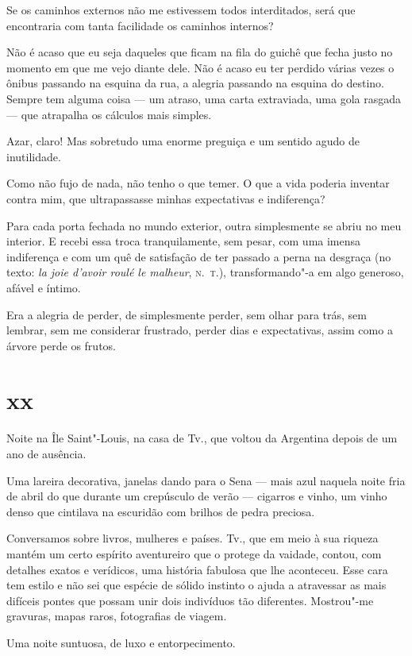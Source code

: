 Se os caminhos externos não me estivessem todos interditados, será que
encontraria com tanta facilidade os caminhos internos?

Não é acaso que eu seja daqueles que ficam na fila do guichê que fecha
justo no momento em que me vejo diante dele. Não é acaso eu ter perdido
várias vezes o ônibus passando na esquina da rua, a
alegria passando na esquina do destino. Sempre tem alguma coisa --- um
atraso, uma carta extraviada, uma gola rasgada --- que
atrapalha os cálculos mais simples.

Azar, claro! Mas sobretudo uma enorme preguiça e um sentido agudo de
inutilidade.

Como não fujo de nada, não tenho o que temer. O que a vida poderia
inventar contra mim, que ultrapassasse minhas expectativas e indiferença?

Para cada porta fechada no mundo exterior, outra simplesmente se abriu
no meu interior. E recebi essa troca tranquilamente, sem pesar, com uma
imensa indiferença e com um quê de satisfação de ter
passado a perna na desgraça (no texto: \emph{la joie d'avoir roulé le
malheur}, \textsc{n.~t.}), transformando"-a em algo generoso, afável e íntimo.

Era a alegria de perder, de simplesmente perder, sem olhar para trás,
sem lembrar, sem me considerar frustrado, perder dias e expectativas,
assim como a árvore perde os frutos.

\section{xx}

Noite na Île Saint"-Louis, na casa de Tv., que voltou da Argentina depois
de um ano de ausência.

Uma lareira decorativa, janelas dando para o Sena --- mais azul naquela
noite fria de abril do que durante um crepúsculo de verão --- cigarros e
vinho, um vinho denso que cintilava na escuridão com brilhos de pedra
preciosa.

Conversamos sobre livros, mulheres e países. Tv., que em meio à sua
riqueza mantém um certo espírito aventureiro que o protege da vaidade,
contou, com detalhes exatos e verídicos, uma história fabulosa que lhe
aconteceu. Esse cara tem estilo e não sei que espécie de sólido
instinto o ajuda a atravessar as mais difíceis pontes que possam
unir dois indivíduos tão diferentes. Mostrou"-me gravuras, mapas raros,
fotografias de viagem.

Uma noite suntuosa, de luxo e entorpecimento.

